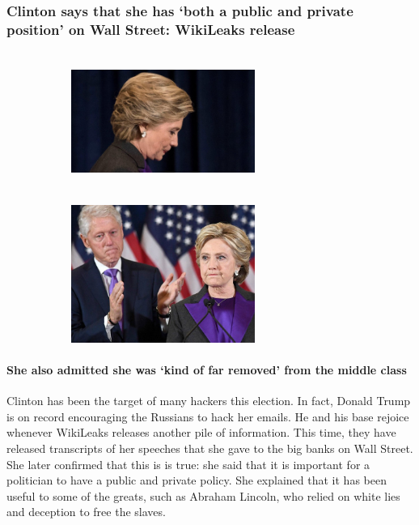 \documentclass[twoside]{article}
\begin{document}
              \subsubsection{Clinton says that she has `both a public and private position' on Wall Street: WikiLeaks release}
              \vskip0.5cm
              \begin{figure}[H]
                \centering
                \begin{subfigure}{.4\textwidth}
                  \centering
                  \includegraphics[width=6cm,height=4.5cm,keepaspectratio]{images/articles/clinton1.jpg}
                  \end{subfigure}%
                  \begin{subfigure}{.4\textwidth}
                    \centering
                    \includegraphics[width=6cm,height=4.5cm,keepaspectratio]{images/articles/clinton2.jpg}
                    \end{subfigure}%
                  \end{figure}
              \paragraph{She also admitted she was `kind of far removed' from the middle class} Clinton has been the target of many hackers this election. In fact, Donald Trump is on record encouraging the Russians to hack her emails. He and his base rejoice whenever WikiLeaks releases another pile of information. This time, they have released transcripts of her speeches that she gave to the big banks on Wall Street. She later confirmed that this is is true: she said that it is important for a politician to have a public and private policy. She explained that it has been useful to some of the greats, such as Abraham Lincoln, who relied on white lies and deception to free the slaves.
\end{document}
